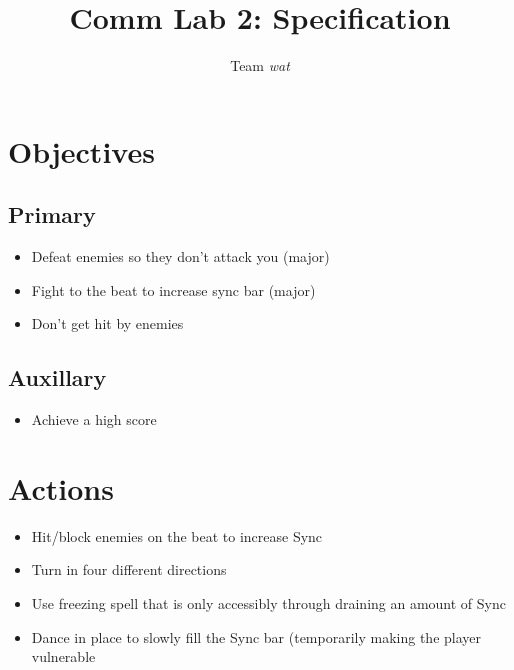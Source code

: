 \documentclass[]{article}
\begin{document}
\title{Comm Lab 2: Specification}
\author{Team \emph{wat}}
\maketitle

\section{Objectives}
\subsection{Primary}
\begin{itemize}
\item Defeat enemies so they don’t attack you (major)
\item Fight to the beat to increase sync bar (major)
\item Don’t get hit by enemies
\end{itemize}
\subsection{Auxillary}
\begin{itemize}
\item Achieve a high score
\end{itemize}

\section{Actions}
\begin{itemize}
\item Hit/block enemies on the beat to increase Sync
\item Turn in four different directions
\item Use freezing spell that is only accessibly through draining an amount of 
  Sync
\item Dance in place to slowly fill the Sync bar (temporarily making the 
  player vulnerable
\end{itemize}
\end{document}
